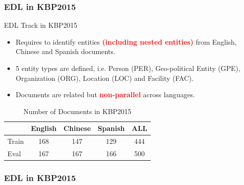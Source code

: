 \documentclass{beamer}
\begin{document}
\begin{frame}
\frametitle{EDL in KBP2015}
\begin{block}{EDL Track in KBP2015 \parencite{kbpoverview2015}}
\begin{itemize}
	\item Requires to identify entities \textbf{\textcolor{red}{(including nested entities)}} from English, Chinese and Spanish documents.
	\item 5 entity types are defined, i.e. Person (PER), Geo-political Entity (GPE), Organization (ORG), Location (LOC) and Facility (FAC).
	\item Documents are related but \textbf{\textcolor{red}{non-parallel}} across languages. 
\end{itemize}
\end{block}
\begin{table}
		\centering
		\begin{tabular}{|l|c|c|c|c|}
			\hline
			& English & Chinese & Spanish & ALL \\
			\hline
			Train & 168 & 147 & 129 & 444 \\
			Eval & 167 & 167 & 166 & 500 \\
			\hline
		\end{tabular}%
	\caption{\scriptsize Number of Documents in KBP2015}
	\label{tbl:kbp2015stat}
\end{table}
\end{frame}

\begin{frame}
\frametitle{EDL in KBP2015}
\begin{table}
	\caption{\scriptsize Entity Discovery Performance of our method on the KBP2015 EDL evaluation data, with comparison to the best systems in KBP2015 official evaluation.}
	\label{tbl:kbp2015cmp}
\end{table}
\end{frame}
\end{document}
